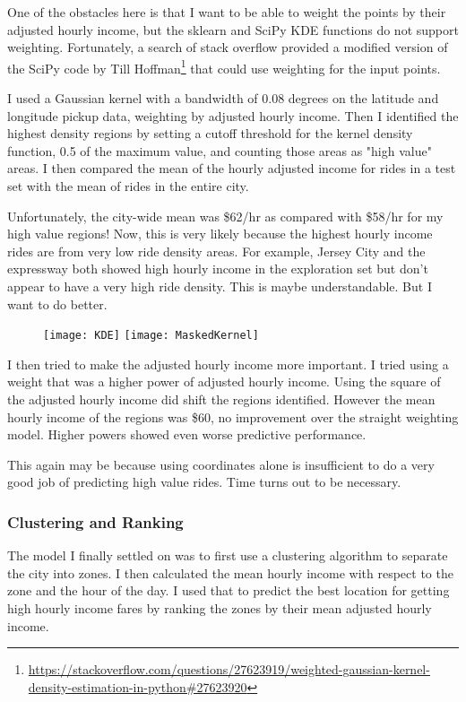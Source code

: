 \documentclass[10pt]{article} %
\begin{document}
One of the obstacles here is that I want to be able to weight the points by their adjusted hourly income, but the sklearn and SciPy KDE functions do not support weighting. Fortunately, a search of stack overflow provided a modified version of the SciPy code by Till Hoffman\footnote{\url{https://stackoverflow.com/questions/27623919/weighted-gaussian-kernel-density-estimation-in-python\#27623920}}
 that could use weighting for the input points.

I used a Gaussian kernel with a bandwidth of 0.08 degrees on the latitude and longitude pickup data, weighting by adjusted hourly income. Then I identified the highest density regions by setting a cutoff threshold for the kernel density function, 0.5 of the maximum value, and counting those areas as "high value" areas. I then compared the mean of the hourly adjusted income for rides in a test set with the mean of rides in the entire city.

Unfortunately, the city-wide mean was \$62/hr as compared with \$58/hr for my high value regions! Now, this is very likely because the highest hourly income rides are from very low ride density areas. For example, Jersey City and the expressway both showed high hourly income in the exploration set but don't appear to have a very high ride density. This is maybe understandable. But I want to do better.

\begin{figure}[h!]
	\centering
	\texttt{[image: KDE]}
	\texttt{[image: MaskedKernel]}
	\caption{}
\end{figure}

I then tried to make the adjusted hourly income more important. I tried using a weight that was a higher power of adjusted hourly income. Using the square of the adjusted hourly income did shift the regions identified. However the mean hourly income of the regions was \$60, no improvement over  the straight weighting model. Higher powers showed even worse predictive performance.

This again may be because using coordinates alone is insufficient to do a very good job of predicting high value rides. Time turns out to be necessary.

\subsubsection*{Clustering and Ranking}
The model I finally settled on was to first use a clustering algorithm to separate the city into zones. I then calculated the mean hourly income with respect to the zone and the hour of the day. I used that  to predict the best location for getting high hourly income fares by ranking the zones by their mean adjusted hourly income.
\end{document}

